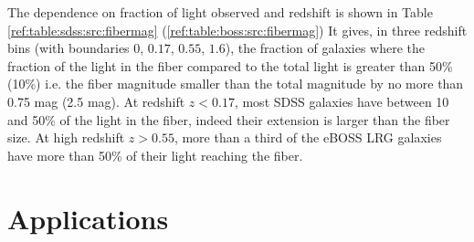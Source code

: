 \documentclass[onecolumn]{aa}
\begin{document}
The dependence on fraction of light observed and redshift is shown in Table 
\ref{ref:table:sdss:src:fibermag} 
(\ref{ref:table:boss:src:fibermag}) 
It gives, in three redshift bins (with boundaries $0$, $0.17$,  $0.55$, $1.6$), the fraction of galaxies where the fraction of the light in the fiber compared to the total light is greater than 50\% (10\%) i.e. the fiber magnitude smaller than the total magnitude by no more than 0.75 mag (2.5 mag). 
At redshift $z<0.17$, most SDSS galaxies have between 10 and 50\% of the light in the fiber, indeed their extension is larger than the fiber size.  
At high redshift $z>0.55$, more than a third of the eBOSS LRG galaxies have more than 50\% of their light reaching the fiber.









\clearpage
\section{Applications}
\label{sec:application}
\end{document}
